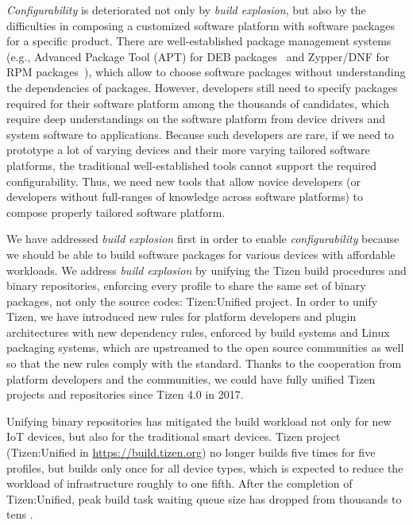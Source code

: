\textit{Configurability} is deteriorated not only by \textit{build explosion}, but also by the difficulties in composing a customized software platform with software packages for a specific product.
There are well-established package management systems (e.g., Advanced Package Tool (APT) for DEB packages~\cite{blackman2000debian} and Zypper/DNF for RPM packages~\cite{foster2003red}), which allow to choose software packages without understanding the dependencies of packages.
However, developers still need to specify packages required for their software platform among the thousands of candidates, which require deep understandings on the software platform from device drivers and system software to applications.
Because such developers are rare, if we need to prototype a lot of varying devices and their more varying tailored software platforms, the traditional well-established tools cannot support the required configurability.
Thus, we need new tools that allow novice developers (or developers without full-ranges of knowledge across software platforms) to compose properly tailored software platform.


We have addressed \textit{build explosion} first in order to enable \textit{configurability} because we should be able to build software packages for various devices with affordable workloads.
We address \textit{build explosion} by unifying the Tizen build procedures and binary repositories, enforcing every profile to share the same set of binary packages, not only the source codes: Tizen:Unified project.
In order to unify Tizen, we have introduced new rules for platform developers and plugin architectures with new dependency rules, enforced by build systems and Linux packaging systems, which are upstreamed to the open source communities as well so that the new rules comply with the standard.
Thanks to the cooperation from platform developers and the communities, we could have fully unified Tizen projects and repositories since Tizen 4.0 in 2017.


Unifying binary repositories has mitigated the build workload not only for new IoT devices, but also for the traditional smart devices.
Tizen project (Tizen:Unified in \url{https://build.tizen.org}) no longer builds five times for five profiles, but builds only once for all device types, which is expected to reduce the workload of infrastructure roughly to one fifth.
After the completion of Tizen:Unified, peak build task waiting queue size has dropped from thousands to tens \cite{2Ham2017TDC}.



